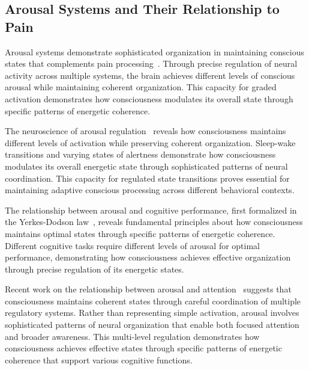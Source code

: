 \subsection*{Arousal Systems and Their Relationship to Pain}

Arousal systems demonstrate sophisticated organization in maintaining conscious states that complements pain processing~\cite{Pfaff2006, amil2024theta}. Through precise regulation of neural activity across multiple systems, the brain achieves different levels of conscious arousal while maintaining coherent organization. This capacity for graded activation demonstrates how consciousness modulates its overall state through specific patterns of energetic coherence.

The neuroscience of arousal regulation~\cite{Saper2010, hunt2024electromagnetic} reveals how consciousness maintains different levels of activation while preserving coherent organization. Sleep-wake transitions and varying states of alertness demonstrate how consciousness modulates its overall energetic state through sophisticated patterns of neural coordination. This capacity for regulated state transitions proves essential for maintaining adaptive conscious processing across different behavioral contexts.

The relationship between arousal and cognitive performance, first formalized in the Yerkes-Dodson law~\cite{Yerkes1908, bosl2025dynamical}, reveals fundamental principles about how consciousness maintains optimal states through specific patterns of energetic coherence. Different cognitive tasks require different levels of arousal for optimal performance, demonstrating how consciousness achieves effective organization through precise regulation of its energetic states.

Recent work on the relationship between arousal and attention~\cite{Pfaff2006, da2024mathematical} suggests that consciousness maintains coherent states through careful coordination of multiple regulatory systems. Rather than representing simple activation, arousal involves sophisticated patterns of neural organization that enable both focused attention and broader awareness. This multi-level regulation demonstrates how consciousness achieves effective states through specific patterns of energetic coherence that support various cognitive functions.

